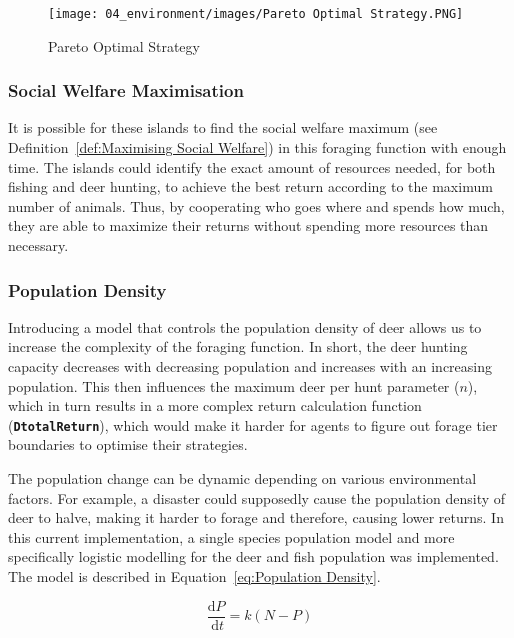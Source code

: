 \begin{figure}[!htb]
    \centering
    \texttt{[image: 04\_environment/images/Pareto Optimal Strategy.PNG]}
    \caption{Pareto Optimal Strategy}
    \label{fig:Pareto Optimal Strategy}
\end{figure}

\subsubsection{Social Welfare Maximisation}

It is possible for these islands to find the social welfare maximum (see Definition~\ref{def:Maximising Social Welfare}) in this foraging function with enough time. The islands could identify the exact amount of resources needed, for both fishing and deer hunting, to achieve the best return according to the maximum number of animals. Thus, by cooperating who goes where and spends how much, they are able to maximize their returns without spending more resources than necessary.

\subsubsection{Population Density}

Introducing a model that controls the population density of deer allows us to increase the complexity of the foraging function. In short, the deer hunting capacity decreases with decreasing population and increases with an increasing population. This then influences the maximum deer per hunt parameter ($n$), which in turn results in a more complex return calculation function (\texttt{\textbf{DtotalReturn}}), which would make it harder for agents to figure out forage tier boundaries to optimise their strategies.

The population change can be dynamic depending on various environmental factors. For example, a disaster could supposedly cause the population density of deer to halve, making it harder to forage and therefore, causing lower returns. In this current implementation, a single species population model and more specifically logistic modelling for the deer and fish population was implemented. 
The model is described in Equation~\eqref{eq:Population Density}.

\begin{equation}
\frac{\mathrm{d} P}{\mathrm{~d} t}=k(N-P)
\label{eq:Population Density}
\end{equation}

